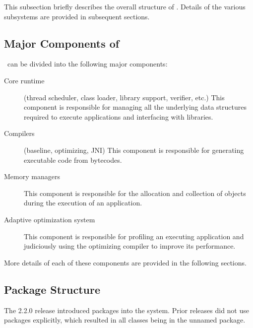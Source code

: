 This subsection briefly describes the overall structure of \jrvm.
Details of the various subsystems are provided in subsequent
sections.  

\subsection{Major Components of \jrvm}


\jrvm\ can be divided into the following major components:
\begin{description}
\item [Core runtime] (thread scheduler, class loader, library support,
verifier, etc.) This component is responsible for 
managing all the underlying data
structures required to execute applications and interfacing with
libraries.

\item [Compilers] (baseline, optimizing, JNI) This component is
responsible for generating executable code from bytecodes.

\item [Memory managers] This component is responsible for the
allocation and collection of objects during the execution of an
application. 

\item [Adaptive optimization system] This component is responsible
for profiling an executing application
and judiciously using the optimizing compiler to
improve its performance.
\end{description}

More details of each of these components are provided in the following sections.

\subsection{Package Structure}
The 2.2.0 release introduced packages into the system.  Prior releases
did not use packages explicitly, which resulted in all classes being in
the unnamed package.  

